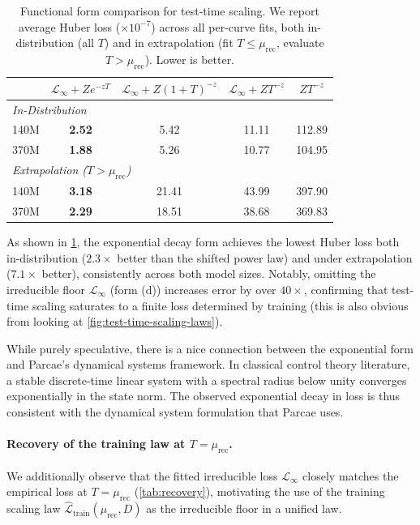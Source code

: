 \begin{table}[h]
\centering
\begin{tabular}{l cccc}
\toprule
& $\mathcal{L}_\infty {+} Z e^{-zT}$ & $\mathcal{L}_\infty {+} Z(1{+}T)^{-z}$ & $\mathcal{L}_\infty {+} Z T^{-z}$ & $Z T^{-z}$ \\
\midrule
\multicolumn{5}{l}{\textit{In-Distribution}} \\
\quad 140M & \textbf{2.52} & 5.42 & 11.11 & 112.89 \\
\quad 370M & \textbf{1.88} & 5.26 & 10.77 & 104.95 \\
\midrule
\multicolumn{5}{l}{\textit{Extrapolation ($T > \mu_{\text{rec}}$)}} \\
\quad 140M & \textbf{3.18} & 21.41 & 43.99 & 397.90 \\
\quad 370M & \textbf{2.29} & 18.51 & 38.68 & 369.83 \\
\bottomrule
\end{tabular}
\caption{Functional form comparison for test-time scaling. We report average Huber loss ($\times 10^{-7}$) across all per-curve fits, both in-distribution (all $T$) and in extrapolation (fit $T \leq \mu_{\text{rec}}$, evaluate $T > \mu_{\text{rec}}$). Lower is better.}
\label{tab:functional-form-ablation}
\end{table}

As shown in \cref{tab:functional-form-ablation}, the exponential decay form achieves the lowest Huber loss both in-distribution ($2.3\times$ better than the shifted power law) and under extrapolation ($7.1\times$ better), consistently across both model sizes. Notably, omitting the irreducible floor $\mathcal{L}_\infty$ (form (d)) increases error by over $40\times$, confirming that test-time scaling saturates to a finite loss determined by training (this is also obvious from looking at \cref{fig:test-time-scaling-laws}). 

While purely speculative, there is a nice connection between the exponential form and Parcae's dynamical systems framework. In classical control theory literature, a stable discrete-time linear system with a spectral radius below unity converges exponentially in the state norm. The observed exponential decay in loss is thus consistent with the dynamical system formulation that Parcae uses.

\paragraph{Recovery of the training law at $T = \mu_\text{rec}$.}
We additionally observe that the fitted irreducible loss $\mathcal{L}_\infty$ closely matches the empirical loss at $T = \mu_\text{rec}$ (\cref{tab:recovery}), motivating the use of the training scaling law $\hat{\mathcal{L}}_{\mathrm{train}}(\mu_\text{rec}, D)$ as the irreducible floor in a unified law.

